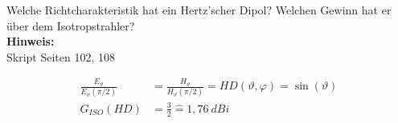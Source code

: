 \begin{question}[section=11,name={Richtcharakteristik},difficulty=,quantity=10,type=thr,tags={20130513}]
	Welche Richtcharakteristik hat ein Hertz'scher Dipol? Welchen Gewinn hat er über dem Isotropstrahler?
	\\ \textbf{Hinweis:}\\
	Skript Seiten 102, 108
\end{question}
\begin{solution}
	\begin{align}
		\frac{E_{\vartheta}}{E_{\vartheta}(\pi/2)}&=\frac{H_{\vartheta}}{H_{\vartheta}(\pi/2)}={HD}(\vartheta, \varphi) = \sin(\vartheta)\\
		G_{ISO}(HD) &= \frac{3}{2} \hat = 1,76~dBi
	\end{align}
\end{solution}